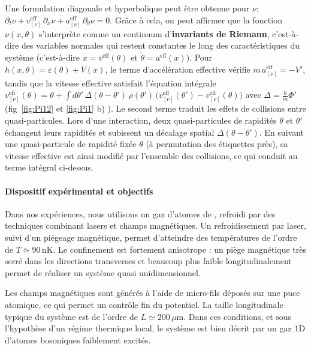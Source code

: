 Une formulation diagonale et hyperbolique peut être obtenue pour $\nu$:
\(
\partial_t \nu
+ v^{\mathrm{eff}}_{[\nu]}\, \partial_x \nu
+ a^{\mathrm{eff}}_{[\nu]}\, \partial_\theta \nu
= 0.
\)
Grâce à cela, on peut affirmer que la fonction $\nu (x , \theta)$ s’interprète
comme un continuum d’{\bf invariants de Riemann}, c’est-à-dire des variables
normales qui restent constantes le long des caractéristiques du
système (c'est-à-dire $\dot{x} = v^{\mathrm{eff}}(\theta)$ et $\dot{\theta} = a^{\mathrm{eff}}(x)$). Pour $h(x,\theta) = \varepsilon(\theta) + V(x)$, le terme d’accélération effective vérifie $m\, a^{\mathrm{eff}}_{[\nu]} = -V'$,
tandis que la vitesse effective satisfait l’équation intégrale
\(
v^{\mathrm{eff}}_{[\nu]}(\theta)
= \theta
+ \int d\theta'\, \Delta(\theta-\theta')\, \rho(\theta')\,
\bigl( v^{\mathrm{eff}}_{[\nu]}(\theta') - v^{\mathrm{eff}}_{[\nu]}(\theta) \bigr)
\)
avec $\Delta = \tfrac\hbar m \Phi'$ (fig~\ref{fig:Pi12} et \ref{fig:Pi1} b) ). Le second terme traduit les effets de collisions entre quasi-particules.
Lors d’une interaction, deux quasi-particules de rapidités $\theta$ et $\theta'$
échangent leurs rapidités et subissent un décalage spatial
$\Delta(\theta-\theta')$. En suivant une quasi-particule de rapidité fixée
$\theta$ (à permutation des étiquettes près), sa vitesse effective est ainsi
modifié par l’ensemble des collisions, ce qui conduit au terme intégral
ci-dessus.

\paragraph{Dispositif expérimental et objectifs}

Dans nos expériences, nous utilisons un gaz d’atomes de ,
refroidi par des techniques combinant lasers et champs magnétiques. Un
refroidissement par laser, suivi d’un piégeage magnétique, permet d’atteindre
des températures de l’ordre de $T \simeq 90\,\mathrm{nK}$. Le confinement est
fortement anisotrope : un piège magnétique très serré dans les directions
transverses et beaucoup plus faible longitudinalement permet de réaliser un
système quasi unidimensionnel.

Les champs magnétiques sont générés à l’aide de micro-fils déposés sur une puce
atomique, ce qui permet un contrôle fin du potentiel. La taille longitudinale
typique du système est de l’ordre de $L \simeq 200\,\mu\mathrm{m}$. Dans ces
conditions, et sous l’hypothèse d’un régime thermique local, le système est
bien décrit par un gaz 1D d’atomes bosoniques faiblement excités.


